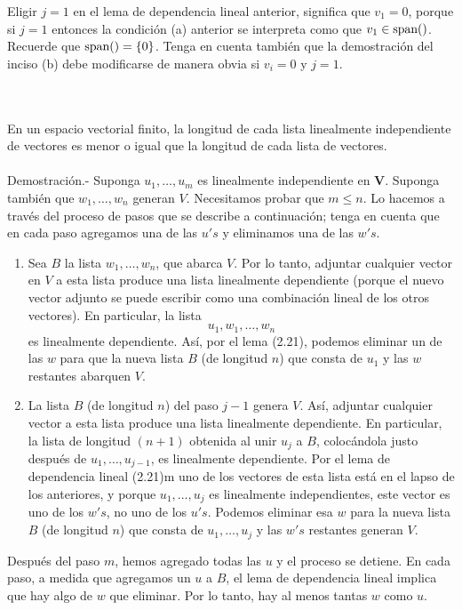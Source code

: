 Eligir $j=1$ en el lema de dependencia lineal anterior, significa que $v_1=0$, porque si $j=1$ entonces la condición (a) anterior se interpreta como que $v_1\in \mathop{\mbox{\normalfont span}}\nolimits()$. Recuerde que $\mathop{\mbox{\normalfont span}}\nolimits()=\left\{0\right\}$. Tenga en cuenta también que la demostración del inciso (b) debe modificarse de manera obvia si $v_i=0$ y $j=1$.

\setcounter{myteo}{22}
\begin{myteo}\;\\\\
    En un espacio vectorial finito, la longitud de cada lista linealmente independiente de vectores es menor o igual que la longitud de cada lista de vectores.\\\\
    Demostración.-\; Suponga $u_1,\ldots,u_m$ es linealmente independiente en $\textbf{V}$. Suponga también que $w_1,\ldots,w_n$ generan $V$. Necesitamos probar que $m\leq n$. Lo hacemos a través del proceso de pasos que se describe a continuación; tenga en cuenta que en cada paso agregamos una de las $u's$ y eliminamos una de las $w's$.

    \begin{enumerate}
	\item Sea $B$ la lista $w_1,\ldots,w_n$, que abarca $V$. Por lo tanto, adjuntar cualquier vector en $V$ a esta lista produce una lista linealmente dependiente (porque el nuevo vector adjunto se puede escribir como una combinación lineal de los otros vectores). En particular, la lista
	$$u_1,w_1,\ldots,w_n$$
	es linealmente dependiente. Así, por el lema (2.21), podemos eliminar un de las $w$ para que la nueva lista $B$ (de longitud $n$) que consta de $u_1$ y las $w$ restantes abarquen $V$.
	\item La lista $B$ (de longitud $n$) del paso $j-1$ genera $V$. Así, adjuntar cualquier vector a esta lista produce una lista linealmente dependiente. En particular, la lista de longitud $(n+1)$ obtenida al unir $u_j$ a $B$, colocándola justo después de $u_1,\ldots,u_{j-1}$, es linealmente dependiente. Por el lema de dependencia lineal (2.21)m uno de los vectores de esta lista está en el lapso de los anteriores, y porque $u_1,\ldots,u_j$ es linealmente independientes, este vector es uno de los $w's$, no uno de los $u's$. Podemos eliminar esa $w$ para la nueva lista $B$ (de longitud $n$) que consta de $u_1,\ldots,u_j$ y las $w's$ restantes generan $V$.
    \end{enumerate}
    Después del paso $m$, hemos agregado todas las $u$ y el proceso se detiene. En cada paso, a medida que agregamos un $u$ a $B$, el lema de dependencia lineal implica que hay algo de $w$ que eliminar. Por lo tanto, hay al menos tantas $w$ como $u$.
\end{myteo}

